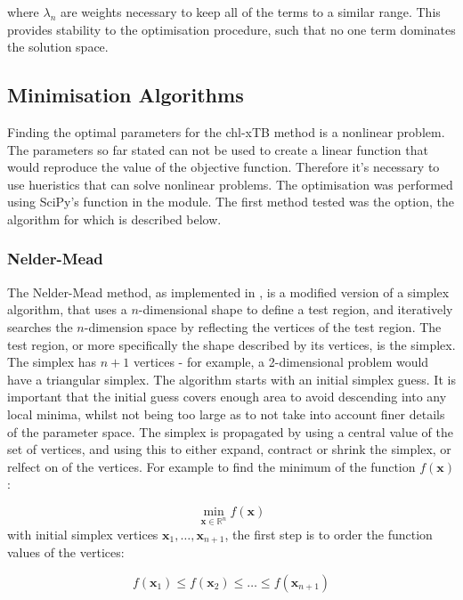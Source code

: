 where $\lambda_n$ are weights necessary to keep all of the terms to a similar range.
This provides stability to the optimisation procedure, such that no one term dominates
the solution space.

\subsection{Minimisation Algorithms}
\label{subsec:algorithms}
Finding the optimal parameters for the chl-xTB method is a nonlinear problem. The
parameters so far stated can not be used to create a linear function that would
reproduce the value of the objective function. Therefore it's necessary to use
hueristics that can solve nonlinear problems. 
The optimisation was performed using SciPy's  function in the 
 module. The first method tested was the  option,
the algorithm for which is described below.

\subsubsection{Nelder-Mead}
\label{nelder_mead}
The Nelder-Mead method, as implemented in , is a modified version of a simplex
algorithm, that uses a $n$-dimensional shape to define a test region, and iteratively
searches the $n$-dimension space by reflecting the vertices of the test region. 
The test region, or more specifically the shape described by its vertices, is the
simplex. The simplex has $n+1$ vertices - for example, a 2-dimensional problem
would have a triangular simplex.
The algorithm starts with an initial simplex guess. It is important that the initial
guess covers enough area to avoid descending into any local minima, whilst not being
too large as to not take into account finer details of the parameter space.
The simplex is propagated by using a central value of the set of vertices, and using
this to either expand, contract or shrink the simplex, or relfect on of the vertices.
For example to find the minimum of the function $f\left(\mathbf{x}\right)$:

\begin{equation}
\min_{\mathbf{x} \in \mathbb{R}^n} f\left( \mathbf{x} \right)
\end{equation}
with initial simplex vertices $\mathbf{x}_1, \dots, \mathbf{x}_{n+1}$,
the first step is to order the function values of the vertices:

\begin{equation}
f\left(\mathbf{x}_1\right) \leq f\left(\mathbf{x}_2\right) \leq \dots \leq f\left(\mathbf{x}_{n+1}\right)
\end{equation}

